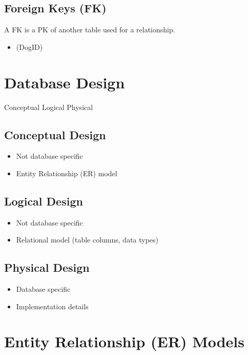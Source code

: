 \documentclass[11pt, a4paper]{article}
\begin{document}
    \subsection{Foreign Keys (FK)}
    A FK is a PK of another table used for a relationship. 
    \begin{itemize}
        \item (DogID)
    \end{itemize}
    


    \section{Database Design}
    Conceptual \rightarrow Logical \rightarrow Physical 

    \subsection{Conceptual Design}
    \begin{itemize}
        \item Not database specific 
        \item Entity Relationship (ER) model 
    \end{itemize}

    \subsection{Logical Design}
    \begin{itemize}
        \item Not database specific 
        \item Relational model (table columns, data types) 
    \end{itemize}

    \subsection{Physical Design}
    \begin{itemize}
        \item Database specific 
        \item Implementation details 
    \end{itemize}



    \section{Entity Relationship (ER) Models}
\end{document}
